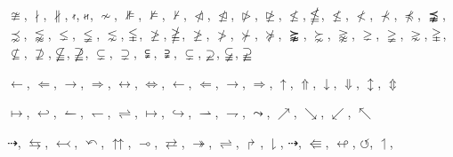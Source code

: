 \documentclass[a4paper,11pt]{article}
\begin{document}
\vspace{1em}





\noindent
$\ncong$, $\nmid$, $\nparallel$, $\nshortmid$, $\nshortparallel$, $\nsim$, $\nVDash$, $\nvDash$, $\nvdash$, $\ntriangleleft$, $\ntrianglelefteq$,
$\ntriangleright$, $\ntrianglerighteq$, $\nleq$, $\nleqq$, $\nleqslant$, $\nless$, $\nprec$, $\npreceq$, $\precnapprox$, $\precnsim$, $\lnapprox$,
$\lneq$, $\lneqq$, $\lnsim$, $\lvertneqq$, $\ngeq$, $\ngeqq$, $\ngeqslant$, $\ngtr$, $\nsucc$, $\nsucceq$, $\succnapprox$,
$\succnsim$, $\gnapprox$, $\gneq$, $\gneqq$, $\gnsim$, $\gvertneqq$, $\nsubseteq$, $\nsupseteq$, $\nsubseteqq$, $\nsupseteqq$, $\subsetneq$,
$\supsetneq$, $\subsetneqq$, $\supsetneqq$, $\varsubsetneq$, $\varsupsetneq$, $\varsubsetneqq$,
$\varsupsetneqq$

\vspace{1em}





\noindent
$\leftarrow$, $\Leftarrow$, $\rightarrow$, $\Rightarrow$, $\leftrightarrow$, $\Leftrightarrow$, $\longleftarrow$, $\Longleftarrow$, $\longrightarrow$, $\Longrightarrow$,
$\uparrow$, $\Uparrow$, $\downarrow$, $\Downarrow$, $\updownarrow$, $\Updownarrow$

\vspace{1em}





\noindent
$\mapsto$, $\hookleftarrow$, $\leftharpoonup$, $\leftharpoondown$, $\rightleftharpoons$, $\longmapsto$, $\hookrightarrow$, $\rightharpoonup$, $\rightharpoondown$, $\leadsto$, $\nearrow$,
$\searrow$, $\swarrow$, $\nwarrow$

\vspace{1em}





\noindent
$\dashrightarrow$, $\leftrightarrows$, $\leftarrowtail$, $\curvearrowleft$, $\upuparrows$, $\multimap$, $\rightleftarrows$, $\twoheadrightarrow$,
$\rightleftharpoons$, $\Rsh$, $\downharpoonright$, $\dashrightarrow$, $\Lleftarrow$,
$\looparrowleft$, $\circlearrowleft$, $\upharpoonleft$,


















\end{document}

